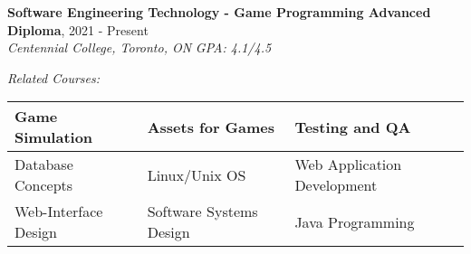 
\textbf{Software Engineering Technology - Game Programming Advanced Diploma}, 	\hfill 2021 - Present\\

\textit{Centennial College, Toronto, ON} \hfill \textit{GPA: 4.1/4.5}

\vspace{3mm}
\textit{Related Courses:}


\begin{center}
\begin{tabular}{  m{5cm}  m{5cm} m{5cm}  } 
\rowcolor{LightCyan}
  \hline
  Game Simulation & Assets for Games & Testing and QA \\ 
  \hline
  Database Concepts & Linux/Unix OS & Web Application Development \\ 
 \rowcolor{LightCyan}
  \hline
  Web-Interface Design & Software Systems Design & Java Programming \\ 
  \hline
\end{tabular}
\end{center}
